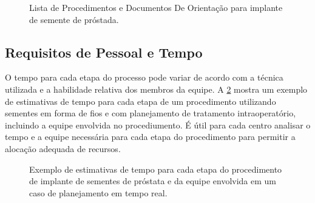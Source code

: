 \documentclass[11pt,a4paper]{article}
\newcounter{exemplo}
\begin{document}
	\begin{figure}[h]
		\centering
		\caption{Lista de Procedimentos e Documentos De Orientação para implante de semente de próstada.}
		\label{fig:documentacaoPSI}
	\end{figure}

\subsection*{Requisitos de Pessoal e Tempo}

	O tempo para cada etapa do processo pode variar de acordo com a técnica utilizada e a habilidade relativa dos membros da equipe. A \ref{fig:tempoEstiomadoImplantesStaffs} mostra um exemplo de estimativas de tempo para cada etapa de um procedimento utilizando sementes em forma de fios e com planejamento de tratamento intraoperatório, incluindo a equipe envolvida no procediumento. É útil para cada centro analisar o tempo e a equipe necessária para cada etapa do procedimento para permitir a alocação adequada de recursos.

	\begin{figure}[h]
		\centering
		\caption{Exemplo de estimativas de tempo para cada etapa do procedimento de implante de sementes de próstata e da equipe envolvida em um caso de planejamento em tempo real.}
		\label{fig:tempoEstiomadoImplantesStaffs}
	\end{figure}



\end{document}
